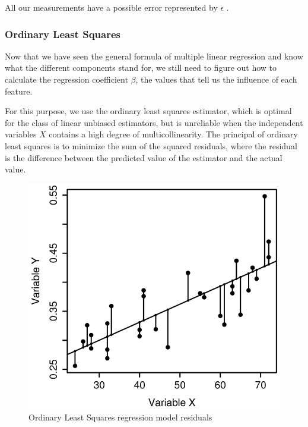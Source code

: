 All our measurements have a possible error represented by $\epsilon$ \cite{Linear-Regression}.

\subsubsection{Ordinary Least Squares}
Now that we have seen the general formula of multiple linear regression and know what the different components stand for, we still need to figure out 
how to calculate the regression coefficient $\beta$, the values that tell us the influence of each feature. 

For this purpose, we use the ordinary least squares estimator, which is optimal for the class of linear unbiased estimators, 
but is unreliable when the independent variables $X$ contains a high degree of multicollinearity.
The principal of ordinary least squares is to minimize the sum of the squared residuals, where the residual is the difference between
the predicted value of the estimator and the actual value. \cite{Linear-Regression}


\begin{figure}[H]
    \centering
    \includegraphics[scale=0.3]{gfx/OLS.png}
    \caption[Ordinary Least Squares regression model residuals]
    {Ordinary Least Squares regression model residuals
    \footnotemark}
    \label{fig:OLS}
\end{figure}

